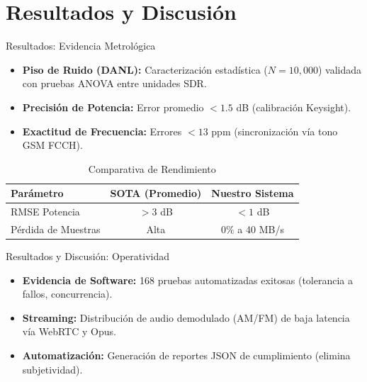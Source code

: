 \documentclass[aspectratio=169]{beamer}
\begin{document}
\section{Resultados y Discusión}
\begin{frame}{Resultados: Evidencia Metrológica}
    \begin{itemize}
        \item \textbf{Piso de Ruido (DANL):} Caracterización estadística ($N=10,000$) validada con pruebas ANOVA entre unidades SDR.
        \item \textbf{Precisión de Potencia:} Error promedio $< 1.5$ dB (calibración Keysight).
        \item \textbf{Exactitud de Frecuencia:} Errores $< 13$ ppm (sincronización vía tono GSM FCCH).
    \end{itemize}
    \vspace{0.3cm}
    \begin{table}
        \centering
        \begin{tabular}{lcc}
            \toprule
            \textbf{Parámetro} & \textbf{SOTA (Promedio)} & \textbf{Nuestro Sistema} \\
            \midrule
            RMSE Potencia & $> 3$ dB & $< 1$ dB \\
            Pérdida de Muestras & Alta & $0\%$ a 40 MB/s \\
            \bottomrule
        \end{tabular}
        \caption{Comparativa de Rendimiento}
    \end{table}
\end{frame}

\begin{frame}{Resultados y Discusión: Operatividad}
    \begin{itemize}
        \item \textbf{Evidencia de Software:} 168 pruebas automatizadas exitosas (tolerancia a fallos, concurrencia).
        \item \textbf{Streaming:} Distribución de audio demodulado (AM/FM) de baja latencia vía WebRTC y Opus.
        \item \textbf{Automatización:} Generación de reportes JSON de cumplimiento (elimina subjetividad).
    \end{itemize}
\end{frame}

\end{document}
